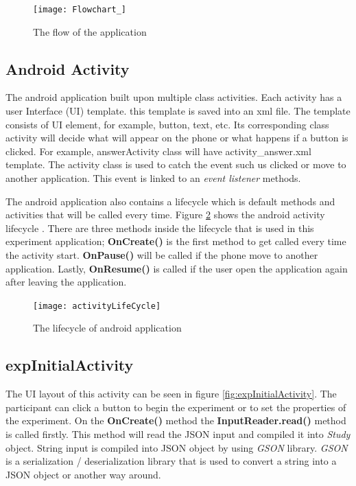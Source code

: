 \begin{figure}
\begin{center}
\texttt{[image: Flowchart\_]}
\end{center}
\centering
\captionsetup{justification=centering}
\caption{The flow of the application}
\label{fig:flowOfApplication}
\end{figure}

\subsection{Android Activity}
The android application built upon multiple class activities.
Each activity has a user Interface (UI) template. this template is saved into an xml file. The template consists of UI element, for example, button, text, etc.
Its corresponding class activity will decide what will appear on the phone or what happens if a button is clicked.
For example, answerActivity class will have activity\_answer.xml template.
The activity class is used to catch the event such us clicked or move to another application. This event is linked to an \textit{event listener} methods.

The android application also contains a lifecycle which is default methods and activities that will be called every time.
Figure \ref{fig:theLifeCycleOfActivity} shows the android activity lifecycle \citep{androidActivity}.
There are three methods inside the lifecycle that is used in this experiment application;
 \textbf{OnCreate()} is the first method to get called every time the activity start.
 \textbf{OnPause()} will be called if the phone move to another application.
 Lastly,  \textbf{OnResume()} is called if the user open the application again after leaving the application.

\begin{figure}[!tbh]
\begin{center}
\texttt{[image: activityLifeCycle]}
\end{center}
\centering
\captionsetup{justification=centering}
\caption{The lifecycle of android application}
\label{fig:theLifeCycleOfActivity}
\end{figure}



\subsection{expInitialActivity}
The UI layout of this activity can be seen in figure \ref{fig:expInitialActivity}.
The participant can click a button to begin the experiment or to set the properties of the experiment.
On the \textbf{OnCreate()} method the \textbf{InputReader.read()} method is called firstly.
This method will read the JSON input and compiled it into \textit{Study} object.
String input is compiled into JSON object by using \textit{GSON} library.
\textit{GSON} is a serialization / deserialization library that is used to convert a string into a JSON object or another way around. \citep{gsonLib}

